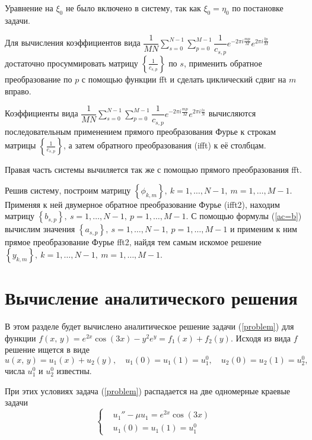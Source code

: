 \documentclass[11pt]{article}
\begin{document}
Уравнение на $\xi_0$ не было включено в систему, так как $\xi_0 = \eta_0$ по постановке задачи.

Для вычисления коэффициентов вида 
$\dfrac{1}{MN}\sum\limits_{s=0}^{N-1}\sum\limits_{p=0}^{M-1}\dfrac{1}{c_{s,p}}e^{-2\pi i\frac{mp}{M}}e^{2\pi i\frac{lp}{M}}$ достаточно
просуммировать матрицу $\left\{\frac{1}{c_{s,p}}\right\}$ по $s$, применить обратное преобразование по $p$ с помощью функции fft и 
сделать циклический сдвиг на $m$ вправо.

Коэффициенты вида 
$\dfrac{1}{MN}\sum\limits_{s=0}^{N-1}\sum\limits_{p=0}^{M-1}\dfrac{1}{c_{s,p}}e^{-2\pi i\frac{mp}{M}}e^{2\pi i\frac{ls}{N}}$ 
вычисляются последовательным применением прямого преобразования Фурье к строкам матрицы  $\left\{\frac{1}{c_{s,p}}\right\}$, а затем
обратного преобразования (ifft) к её столбцам.

Правая часть системы вычиляется так же с помощью прямого преобразования fft.

Решив систему, построим матрицу $\left\{\phi_{k,m}\right\},\ k = 1,\ldots,N-1, \ m = 1,\ldots,M-1$.
Применяя к ней двумерное обратное преобразование Фурье (ifft2), находим матрицу
 $\left\{b_{s,p}\right\},\ s = 1,\ldots,N-1, \ p = 1,\ldots,M-1$.
С помощью формулы (\ref{ac=b}) вычислим значения $\left\{a_{s,p}\right\},\ s = 1,\ldots,N-1, \ p = 1,\ldots,M-1$ и применим к ним
прямое преобразование Фурье fft2, найдя тем самым искомое решение 
$\left\{y_{k,m}\right\},\ k = 1,\ldots,N-1, \ m = 1,\ldots,M-1$.

\newpage
\section{Вычисление аналитического решения}
В этом разделе будет вычислено аналитическое решение задачи (\ref{problem}) для функции 
$f\left(x, \, y\right) = e^{2x}\cos\left(3x\right)-y^2e^y = f_1(x) + f_2(y).$ Исходя из вида $f$ решение ищется в виде 
$$u(x, \, y) = u_1(x) + u_2(y), \quad u_1(0) = u_1(1) = u_1^0, \quad u_2(0) = u_2(1) = u_2^0,$$
числа $u_1^0$ и $u_2^0$ известны.

При этих условиях задача (\ref{problem}) распадается на две одномерные краевые задачи
\begin{equation}
\left\{
	\begin{aligned}
	& u_1''-\mu u_1 = e^{2x}\cos(3x) \label{bvp1} \\
	& u_1(0) = u_1(1) = u_1^0 
	\end{aligned}	
\right.
\end{equation}
\end{document}
